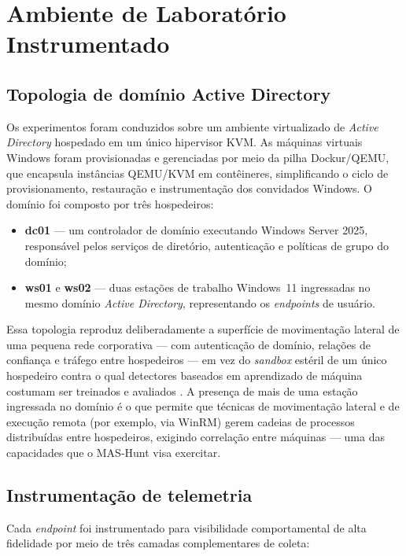 \section{Ambiente de Laboratório Instrumentado}
\label{sec:met-laboratorio}

\subsection{Topologia de domínio Active Directory}

Os experimentos foram conduzidos sobre um ambiente virtualizado de
\textit{Active Directory} hospedado em um único hipervisor KVM. As máquinas
virtuais Windows foram provisionadas e gerenciadas por meio da pilha
Dockur/QEMU, que encapsula instâncias QEMU/KVM em contêineres, simplificando o
ciclo de provisionamento, restauração e instrumentação dos convidados Windows.
O domínio foi composto por três hospedeiros:

\begin{itemize}
    \item \textbf{dc01} --- um controlador de domínio executando Windows Server
    2025, responsável pelos serviços de diretório, autenticação e políticas de
    grupo do domínio;
    \item \textbf{ws01} e \textbf{ws02} --- duas estações de trabalho Windows~11
    ingressadas no mesmo domínio \textit{Active Directory}, representando os
    \textit{endpoints} de usuário.
\end{itemize}

Essa topologia reproduz deliberadamente a superfície de movimentação lateral de
uma pequena rede corporativa --- com autenticação de domínio, relações de
confiança e tráfego entre hospedeiros --- em vez do \textit{sandbox} estéril de
um único hospedeiro contra o qual detectores baseados em aprendizado de máquina
costumam ser treinados e avaliados \cite{ucci2019}. A presença de mais de
uma estação ingressada no domínio é o que permite que técnicas de movimentação
lateral e de execução remota (por exemplo, via WinRM) gerem cadeias de
processos distribuídas entre hospedeiros, exigindo correlação entre máquinas ---
uma das capacidades que o MAS-Hunt visa exercitar.

\subsection{Instrumentação de telemetria}

Cada \textit{endpoint} foi instrumentado para visibilidade comportamental de
alta fidelidade por meio de três camadas complementares de coleta:

